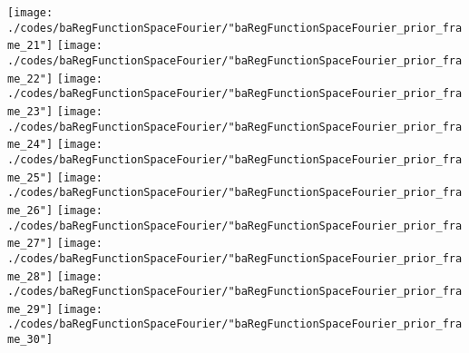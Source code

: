 \begin{frame}{\insertsection}
\begin{center}
{\begin{animateinline}{15}
				 \texttt{[image: ./codes/baRegFunctionSpaceFourier/"baRegFunctionSpaceFourier\_prior\_frame\_21"]}\newframe
				 \texttt{[image: ./codes/baRegFunctionSpaceFourier/"baRegFunctionSpaceFourier\_prior\_frame\_22"]}\newframe
				 \texttt{[image: ./codes/baRegFunctionSpaceFourier/"baRegFunctionSpaceFourier\_prior\_frame\_23"]}\newframe
				 \texttt{[image: ./codes/baRegFunctionSpaceFourier/"baRegFunctionSpaceFourier\_prior\_frame\_24"]}\newframe
				 \texttt{[image: ./codes/baRegFunctionSpaceFourier/"baRegFunctionSpaceFourier\_prior\_frame\_25"]}\newframe
				 \texttt{[image: ./codes/baRegFunctionSpaceFourier/"baRegFunctionSpaceFourier\_prior\_frame\_26"]}\newframe
				 \texttt{[image: ./codes/baRegFunctionSpaceFourier/"baRegFunctionSpaceFourier\_prior\_frame\_27"]}\newframe
				 \texttt{[image: ./codes/baRegFunctionSpaceFourier/"baRegFunctionSpaceFourier\_prior\_frame\_28"]}\newframe
				 \texttt{[image: ./codes/baRegFunctionSpaceFourier/"baRegFunctionSpaceFourier\_prior\_frame\_29"]}\newframe
				 \texttt{[image: ./codes/baRegFunctionSpaceFourier/"baRegFunctionSpaceFourier\_prior\_frame\_30"]}
			 \end{animateinline}
			}
	\end{center}
    
\end{frame}

